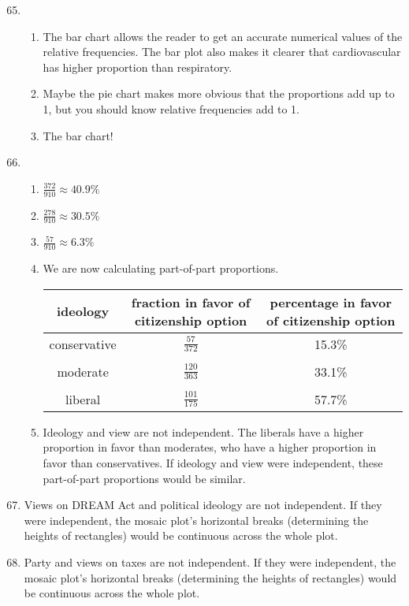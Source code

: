 \documentclass[12pt,letterpaper]{article}
\begin{document}
\begin{enumerate}
\setcounter{enumi}{64}

\item \begin{enumerate}
\item The bar chart allows the reader to get an accurate numerical values of the relative frequencies. The bar plot also makes it clearer that cardiovascular has higher proportion than respiratory. 
\item Maybe the pie chart makes more obvious that the proportions add up to 1, but you should know relative frequencies add to 1.
\item The bar chart!
\end{enumerate}


\item \begin{enumerate}
\item $\frac{372}{910} \approx 40.9\%$
\item $\frac{278}{910} \approx 30.5\%$
\item $\frac{57}{910} \approx 6.3\%$
\item We are now calculating part-of-part proportions.
\begin{center}
\begin{tabular}{|c | c | c |} \hline
ideology & fraction in favor of citizenship option & percentage in favor of citizenship option \\ \hline
conservative & $\frac{57}{372}$ & 15.3\% \\ &&\\
moderate & $\frac{120}{363}$ & 33.1\% \\ && \\
liberal & $\frac{101}{175}$ & 57.7\% \\ \hline
\end{tabular}
\end{center}
\item Ideology and view are not independent. The liberals have a higher proportion in favor than moderates, who have a higher proportion in favor than conservatives. If ideology and view were independent, these part-of-part proportions would be similar.
\end{enumerate}

\item Views on DREAM Act and political ideology are not independent. If they were independent, the mosaic plot's horizontal breaks (determining the heights of rectangles) would be continuous across the whole plot.

\item Party and views on taxes are not independent.  If they were independent, the mosaic plot's horizontal breaks (determining the heights of rectangles) would be continuous across the whole plot.

\end{enumerate}
\end{document}
